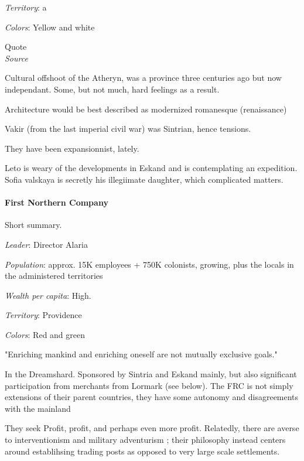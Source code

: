 \textit{Territory}: a
    
\textit{Colors}: Yellow and white


\begin{rpg-quotebox}
    Quote \\ \textendash \textit{Source}
    \end{rpg-quotebox}


Cultural offshoot of the Atheryn, was a province three centuries ago but now independant. Some, but not much, hard feelings as a result.

Architecture would be best described as modernized romanesque (renaissance)

Vakir (from the last imperial civil war) was Sintrian, hence tensions.

They have been expansionnist, lately.


Leto is weary of the developments in Eskand and is contemplating an expedition.
Sofia valskaya is secretly his illegiimate daughter, which complicated matters.



\paragraph{First Northern Company}


Short summary.

\textit{Leader}: Director Alaria

\textit{Population}: approx. 15K employees + 750K colonists, growing, plus the locals in the administered territories

\textit{Wealth per capita}: High.

\textit{Territory}: Providence
    
\textit{Colors}: Red and green


\begin{rpg-quotebox}
"Enriching mankind and enriching oneself are not mutually exclusive goals."
\end{rpg-quotebox}


In the Dreamshard. Sponsored by Sintria and Eskand mainly, but also significant participation from merchants from Lormark (see below).  
The FRC is not simply extensions of their parent countries, they have some autonomy and disagreements with the mainland


They seek Profit, profit, and perhaps even more profit. Relatedly, there are averse to interventionism and military adventurism ; their philosophy instead centers around establihsing trading posts as opposed to very large scale settlements.

